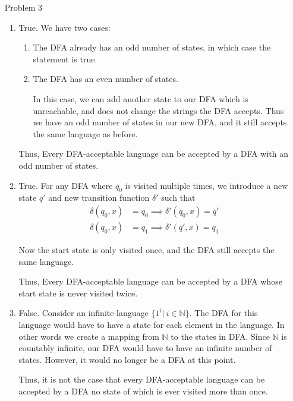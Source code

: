 \documentclass[12pt,letterpaper]{article}
\begin{document}
\begin{enumerate}
    \item[Problem 3]
      \begin{enumerate}
        \item True.
          We have two cases:
            \begin{enumerate}
              \item The DFA already has an odd number of states, in which case the statement is true.
              \item The DFA has an even number of states.

                In this case, we can add another state to our DFA which is unreachable,
                and does not change the strings the DFA accepts.
                Thus we have an odd number of states in our new DFA, and it still accepts the same language as before.
            \end{enumerate}

            Thus, Every DFA-acceptable language can be accepted by a DFA with an odd number of states.

        \item True.
          For any DFA where $q_0$ is visited multiple times,
          we introduce a new state $q'$ and new transition function $\delta'$ such that
          \begin{align*}
            \delta(q_0, x) &= q_0 \implies \delta'(q_0, x) = q' \\
            \delta(q_0, x) &= q_1 \implies \delta'(q', x) = q_1
          \end{align*}

          Now the start state is only visited once,
          and the DFA still accepts the same language.

          Thus, Every DFA-acceptable language can be accepted by a DFA whose start state is never visited twice.

        \item False.
          Consider an infinite language $\{1^i | \ i \in \mathbb{N}\}$.
          The DFA for this language would have to have a state for each element in the language.
          In other words we create a mapping from $\mathbb{N}$ to the states in DFA.
          Since $\mathbb{N}$ is countably infinite,
          our DFA would have to have an infinite number of states.
          However, it would no longer be a DFA at this point.

          Thus, it is not the case that
          every DFA-acceptable language can be accepted by a DFA no state of which is ever visited more
than once.


\end{enumerate}
\end{enumerate}
\end{document}
